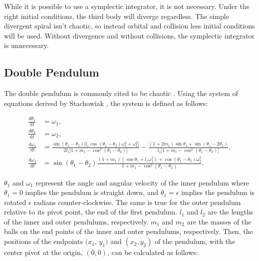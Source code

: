 \documentclass{article}
\newcommand{\der}[2][t]{\frac{\mathrm{d}#2}{\mathrm{d}#1}}
\begin{document}
While it is possible to use a symplectic integrator, it is not necessary. Under the right 
initial conditions, the third body will diverge regardless. The simple divergent spiral
isn't chaotic, so instead orbital and collision less initial conditions will be used.
Without divergence and without collisions, the symplectic integrator is unnecessary.

\subsection{Double Pendulum}

The double pendulum is commonly cited to be chaotic 
\cite{stachowiak2006numerical} \cite{levien1993double}. Using the system 
of equations derived by Stachowiak \cite{stachowiak2006numerical}, the system is
defined as follows:

\begin{align}
    \der{\theta_1} &= \omega_1, \nonumber \\
    \der{\theta_2} &= \omega_2, \nonumber \\
    \der{\omega_1} &= 
    \frac{
        \sin(\theta_1 - \theta_2) \lbrack
            l_1 \cos(\theta_1 - \theta_2) \omega_1^2 + \omega_2^2
        \rbrack
    }{
        2 l_1 \lbrack
            1 + m_1 - \cos^2(\theta_1 - \theta_2)
        \rbrack
    }
    -
    \frac{
        (1 + 2 m_1) \sin \theta_1 + \sin(\theta_1 - 2 \theta_2)
    }{
        l_1 \lbrack
            1 + m_1 - \cos^2(\theta_1 - \theta_2)
        \rbrack
    }
    , \nonumber \\
    \der{\omega_2} &= \sin (\theta_1 - \theta_2) 
    \frac{
        (1+m_1) (\cos \theta_1 + l_1 \omega_1^2)
        +
        \cos(\theta_1 - \theta_2) \omega_2^2
    }{
        1 + m_1 - \cos^2(\theta_1 - \theta_2)
    }. \label{eq:doub_pen}
\end{align}

$\theta_1$ and $\omega_1$ represent the angle and angular velocity of the inner pendulum 
where $\theta_1=0$ implies the pendulum is straight down, and $\theta_1=\epsilon$ implies 
the pendulum is rotated $\epsilon$ radians counter-clockwise. The same is true for the 
outer pendulum relative to its pivot point, the end of the first pendulum. $l_1$ and $l_2$ 
are the lengths of the inner and outer pendulums, respectively. $m_1$ and $m_2$ are the 
masses of the balls on the end points of the inner and outer pendulums, respectively.
Then, the positions of the endpoints $(x_1$, $y_1)$ and $(x_2, y_2)$ of the pendulum, with 
the center pivot at the origin, $(0, 0)$, can be calculated as follows:
\end{document}
